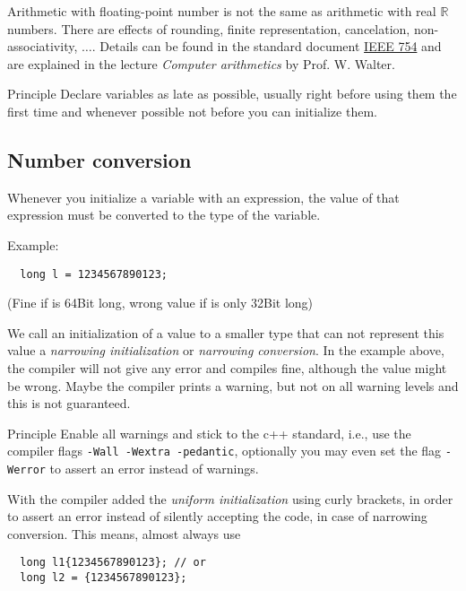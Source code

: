 \begin{rem}
  Arithmetic with floating-point number is not the same as arithmetic with real $\mathbb{R}$ numbers. There are effects of rounding,
  finite representation, cancelation, non-associativity, $\ldots$. Details can be found in the standard document
  \href{https://standards.ieee.org/content/ieee-standards/en/standard/754-2019.html}{IEEE 754} and are explained in the lecture
  \emph{Computer arithmetics} by Prof. W. Walter.
\end{rem}


\begin{guideline}{Principle}
  Declare variables as late as possible, usually right before using them the first time and whenever possible not before you can initialize them.
\end{guideline}



\subsection{Number conversion}
Whenever you initialize a variable with an expression, the value of that expression must be converted to the type of the variable.

Example:
\begin{verbatim}
  long l = 1234567890123;
\end{verbatim}
(Fine if  is 64Bit long, wrong value if  is only 32Bit long)

We call an initialization of a value to a smaller type that can not represent this value a \emph{narrowing initialization} or
\emph{narrowing conversion}. In the example above, the compiler will not give any error and compiles fine, although the value might be wrong.
Maybe the compiler prints a warning, but not on all warning levels and this is not guaranteed.

\begin{guideline}{Principle}
  Enable all warnings and stick to the c++ standard, i.e., use the compiler flags \texttt{-Wall -Wextra -pedantic}, optionally you may
  even set the flag \texttt{-Werror} to assert an error instead of warnings.
\end{guideline}

With\marginpar{[\cxx{11}]}  the compiler added the \emph{uniform initialization} using curly brackets, in order to assert an error
instead of silently accepting the code, in case of narrowing conversion. This means, almost always use
\begin{verbatim}
  long l1{1234567890123}; // or
  long l2 = {1234567890123};
\end{verbatim}

